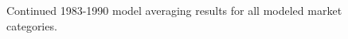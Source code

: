 \documentclass[12pt]{article}
\begin{document}
\begin{landscape}
\begin{figure}
\begin{minipage}[c]{0.3\textwidth}
\end{minipage}
\caption{Continued 1983-1990 model averaging results for all modeled market categories.}
\label{colorTabApp832}
\end{figure}
\end{landscape}

%
\clearpage
\singlespacing
%
\end{document}

